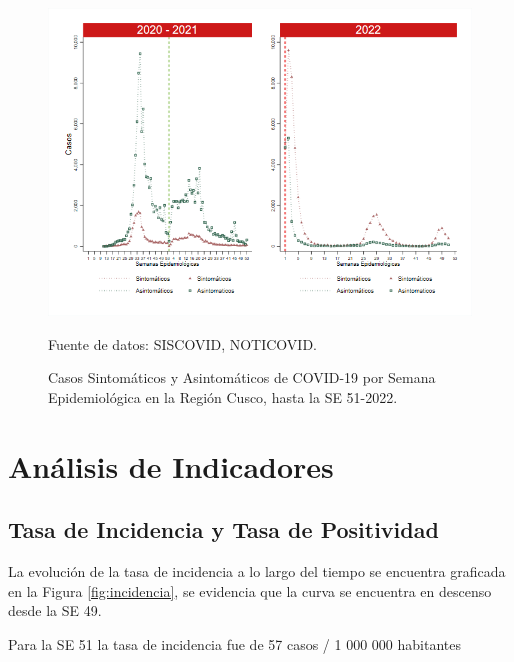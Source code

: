 \documentclass[12pt,a4paper,openany]{book}
\begin{document}
	\begin{figure}[h]
		\caption{Casos Sintomáticos y Asintomáticos de COVID-19 por Semana Epidemiológica en la Región Cusco, hasta la SE 51-2022.  }\label{fig:sintomaticos_asintomati}
		
		\begin{center}
			\includegraphics[width=0.95\linewidth]{../figuras/sintomaticos_20_21_22.png}
		\end{center}
		{\footnotesize {Fuente de datos: SISCOVID, NOTICOVID.}}
	\end{figure}
	\clearpage
	
	
	
	\clearpage
	
	\section*{Análisis de Indicadores}
	\subsection*{Tasa de Incidencia y Tasa de Positividad}
	\noindent La evolución de la tasa de incidencia a lo largo del tiempo se encuentra graficada en la Figura \ref{fig:incidencia}, se evidencia que la curva se encuentra en descenso desde la SE 49.
	
	Para la SE 51 la tasa de incidencia fue de 57 casos / 1 000 000 habitantes
	
\end{document}
